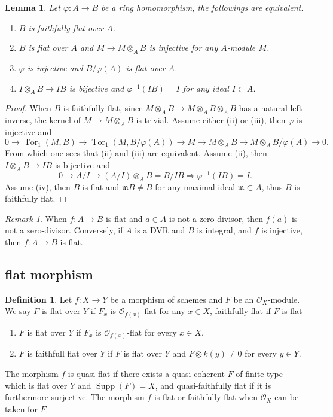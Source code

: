 \documentclass[leqno]{amsart}
\DeclareMathOperator{\Supp}{Supp}
\newcommand{\1}{\mathbf{1}}
\newcommand{\fm}{\mathfrak m}
\DeclareMathOperator{\Tor}{Tor}
\newtheorem{lem}[thm]{Lemma}
\theoremstyle{definition}
\newtheorem{defn}[thm]{Definition}
\theoremstyle{remark}
\newtheorem{rem}[thm]{Remark}
\begin{document}
\begin{lem}
	Let $\varphi\colon A\to B$ be a ring homomorphism,
	the followings are equivalent.
\begin{enumerate}
	\item $B$ is faithfully flat over $A$.
	\item $B$ is flat over $A$ and 
	 $M\to M\otimes_AB$ is injective for any  $A$-module $M$.
	\item  $\varphi$ is injective and 
	$B/\varphi(A)$ is flat over $A$.
	\item  $I\otimes_AB\to IB$ is bijective
	and  $\varphi^{-1}(IB)=I$ for any ideal $I\subset A$.
\end{enumerate}
\end{lem}
\begin{proof}
	When $B$ is faithfully flat,
	since $M\otimes_AB\to M\otimes_AB\otimes_AB$
	has a natural left inverse,
	the kernel of $M\to M\otimes_AB$ is trivial.
	Assume either (ii) or (iii),
	then $\varphi$ is injective and 
	\[
		 0\to\Tor_1(M,B)\to \Tor_1(M,B/\varphi(A))\to 
		 M\to M\otimes_AB\to M\otimes_AB/\varphi(A)\to 0.
	\]
	From which one sees that (ii) and (iii) are equivalent.
	Assume (ii), then $I\otimes_AB\to IB$ is bijective and
	\[
		0\to A/I\to (A/I)\otimes_AB=B/IB \Longrightarrow
		\varphi^{-1}(IB)=I.
	\]
	Assume (iv), then $B$ is flat 
	and  $\fm B\neq B$ for any maximal ideal  $\fm\subset A$,
	thus  $B$ is faithfully flat.
\end{proof}

\begin{rem}
	When $f\colon A\to B$ is flat and  $a\in A$ is not a zero-divisor,
	then  $f(a)$ is not a zero-divisor.
	Conversely, if $A$ is a DVR and $B$ is integral,
	and  $f$ is injective, then  $f\colon A\to B$ is flat.
\end{rem}

\subsection{flat morphism}
\begin{defn}
	Let $f\colon X\to Y$ be a morphism of schemes
	and  $F$ be an $\mathcal{O}_X$-module.
	We say $F$ is flat over $Y$ if $F_x$ is  
	$\mathcal{O}_{f(x)}$-flat for any $x\in X$,
	faithfully flat if $F$ is flat 
	\begin{enumerate}
	\item $F$ is flat over $Y$ if $F_x$ is 
	$\mathcal{O}_{f(x)}$-flat for every $x\in X$.
	\item  $F$ is faithfull flat over $Y$ if 
	$F$ is flat over $Y$ and $F\otimes k(y)\neq 0$
	for every $y\in Y$.
	\end{enumerate}

	The morphism $f$ is quasi-flat if 
	there exists a quasi-coherent $F$ of finite type
	which is flat over $Y$ and $\Supp(F)=X$,
	and quasi-faithfully flat if it is furthermore surjective.
	The morphism $f$ is flat or faithfully flat
	when $\mathcal{O}_X$ can be taken for $F$.
\end{defn}
\end{document}
